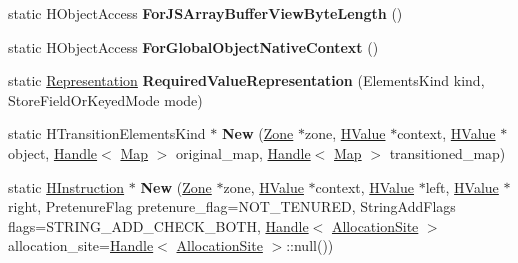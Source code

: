 \begin{DoxyCompactItemize}
\item 
\hypertarget{classv8_1_1internal_1_1_v8___f_i_n_a_l_a6827f72735eeac6663c73073df53bab4}{}static H\+Object\+Access {\bfseries For\+J\+S\+Array\+Buffer\+View\+Byte\+Length} ()\label{classv8_1_1internal_1_1_v8___f_i_n_a_l_a6827f72735eeac6663c73073df53bab4}

\item 
\hypertarget{classv8_1_1internal_1_1_v8___f_i_n_a_l_a1d7fc09c957b2bcce7d7ee2f8f3159d5}{}static H\+Object\+Access {\bfseries For\+Global\+Object\+Native\+Context} ()\label{classv8_1_1internal_1_1_v8___f_i_n_a_l_a1d7fc09c957b2bcce7d7ee2f8f3159d5}

\item 
\hypertarget{classv8_1_1internal_1_1_v8___f_i_n_a_l_a28045963f16a9580fc3f7b5441ed1be3}{}static \hyperlink{classv8_1_1internal_1_1_representation}{Representation} {\bfseries Required\+Value\+Representation} (Elements\+Kind kind, Store\+Field\+Or\+Keyed\+Mode mode)\label{classv8_1_1internal_1_1_v8___f_i_n_a_l_a28045963f16a9580fc3f7b5441ed1be3}

\item 
\hypertarget{classv8_1_1internal_1_1_v8___f_i_n_a_l_a569481003017d951ebfee6254cf4c9b7}{}static H\+Transition\+Elements\+Kind $\ast$ {\bfseries New} (\hyperlink{classv8_1_1internal_1_1_zone}{Zone} $\ast$zone, \hyperlink{classv8_1_1internal_1_1_h_value}{H\+Value} $\ast$context, \hyperlink{classv8_1_1internal_1_1_h_value}{H\+Value} $\ast$object, \hyperlink{classv8_1_1internal_1_1_handle}{Handle}$<$ \hyperlink{classv8_1_1internal_1_1_map}{Map} $>$ original\+\_\+map, \hyperlink{classv8_1_1internal_1_1_handle}{Handle}$<$ \hyperlink{classv8_1_1internal_1_1_map}{Map} $>$ transitioned\+\_\+map)\label{classv8_1_1internal_1_1_v8___f_i_n_a_l_a569481003017d951ebfee6254cf4c9b7}

\item 
\hypertarget{classv8_1_1internal_1_1_v8___f_i_n_a_l_ae36965a42b181e94fe5c870890a18cb8}{}static \hyperlink{classv8_1_1internal_1_1_h_instruction}{H\+Instruction} $\ast$ {\bfseries New} (\hyperlink{classv8_1_1internal_1_1_zone}{Zone} $\ast$zone, \hyperlink{classv8_1_1internal_1_1_h_value}{H\+Value} $\ast$context, \hyperlink{classv8_1_1internal_1_1_h_value}{H\+Value} $\ast$left, \hyperlink{classv8_1_1internal_1_1_h_value}{H\+Value} $\ast$right, Pretenure\+Flag pretenure\+\_\+flag=N\+O\+T\+\_\+\+T\+E\+N\+U\+R\+E\+D, String\+Add\+Flags flags=S\+T\+R\+I\+N\+G\+\_\+\+A\+D\+D\+\_\+\+C\+H\+E\+C\+K\+\_\+\+B\+O\+T\+H, \hyperlink{classv8_1_1internal_1_1_handle}{Handle}$<$ \hyperlink{classv8_1_1internal_1_1_allocation_site}{Allocation\+Site} $>$ allocation\+\_\+site=\hyperlink{classv8_1_1internal_1_1_handle}{Handle}$<$ \hyperlink{classv8_1_1internal_1_1_allocation_site}{Allocation\+Site} $>$\+::null())\label{classv8_1_1internal_1_1_v8___f_i_n_a_l_ae36965a42b181e94fe5c870890a18cb8}


\end{DoxyCompactItemize}
